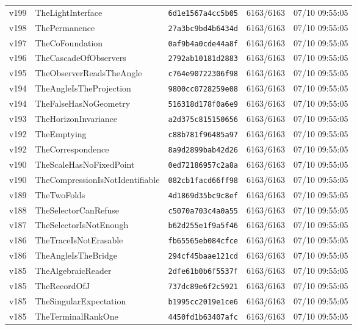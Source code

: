 \documentclass[11pt]{article}
\theoremstyle{definition}\newtheorem{deriv}{Derivação}
\begin{document}
{\begin{longtable}{@{}lllll@{}}
v199 & TheLightInterface & \texttt{6d1e1567a4cc5b05} & 6163/6163 & 07/10 09:55:05 \\
v198 & ThePermanence & \texttt{27a3bc9bd4b6434d} & 6163/6163 & 07/10 09:55:05 \\
v197 & TheCoFoundation & \texttt{0af9b4a0cde44a8f} & 6163/6163 & 07/10 09:55:05 \\
v196 & TheCascadeOfObservers & \texttt{2792ab10181d2883} & 6163/6163 & 07/10 09:55:05 \\
v195 & TheObserverReadsTheAngle & \texttt{c764e90722306f98} & 6163/6163 & 07/10 09:55:05 \\
v194 & TheAngleIsTheProjection & \texttt{9800cc0728259e08} & 6163/6163 & 07/10 09:55:05 \\
v194 & TheFalseHasNoGeometry & \texttt{516318d178f0a6e9} & 6163/6163 & 07/10 09:55:05 \\
v193 & TheHorizonInvariance & \texttt{a2d375c815150656} & 6163/6163 & 07/10 09:55:05 \\
v192 & TheEmptying & \texttt{c88b781f96485a97} & 6163/6163 & 07/10 09:55:05 \\
v192 & TheCorrespondence & \texttt{8a9d2899bab42d26} & 6163/6163 & 07/10 09:55:05 \\
v190 & TheScaleHasNoFixedPoint & \texttt{0ed72186957c2a8a} & 6163/6163 & 07/10 09:55:05 \\
v190 & TheCompressionIsNotIdentifiable & \texttt{082cb1facd66ff98} & 6163/6163 & 07/10 09:55:05 \\
v189 & TheTwoFolds & \texttt{4d1869d35bc9c8ef} & 6163/6163 & 07/10 09:55:05 \\
v188 & TheSelectorCanRefuse & \texttt{c5070a703c4a0a55} & 6163/6163 & 07/10 09:55:05 \\
v187 & TheSelectorIsNotEnough & \texttt{b62d255e1f9a5f46} & 6163/6163 & 07/10 09:55:05 \\
v186 & TheTraceIsNotErasable & \texttt{fb65565eb084cfce} & 6163/6163 & 07/10 09:55:05 \\
v186 & TheAngleIsTheBridge & \texttt{294cf45baae121cd} & 6163/6163 & 07/10 09:55:05 \\
v185 & TheAlgebraicReader & \texttt{2dfe61b0b6f5537f} & 6163/6163 & 07/10 09:55:05 \\
v185 & TheRecordOfJ & \texttt{737dc89e6f2c5921} & 6163/6163 & 07/10 09:55:05 \\
v185 & TheSingularExpectation & \texttt{b1995cc2019e1ce6} & 6163/6163 & 07/10 09:55:05 \\
v185 & TheTerminalRankOne & \texttt{4450fd1b63407afc} & 6163/6163 & 07/10 09:55:05 \\

\end{longtable}}
\end{document}
